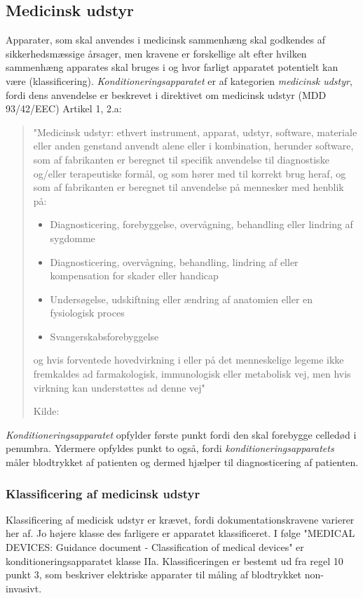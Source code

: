 \subsection{Medicinsk udstyr}
Apparater, som skal anvendes i medicinsk sammenhæng skal godkendes af sikkerhedsmæssige årsager, men kravene er forskellige alt efter hvilken sammenhæng apparates skal bruges i og hvor farligt apparatet potentielt kan være (klassificering). \textit{Konditioneringsapparatet} er af kategorien \textit{medicinsk udstyr}, fordi dens anvendelse er beskrevet i direktivet om medicinsk udstyr (MDD 93/42/EEC) Artikel 1, 2.a:

\begin{quote}
	"Medicinsk udstyr: ethvert instrument, apparat, udstyr, software,
	materiale eller anden genstand anvendt alene eller i kombination,
	herunder software, som af fabrikanten er beregnet til specifik anvendelse
	til diagnostiske og/eller terapeutiske formål, og som hører med
	til korrekt brug heraf, og som af fabrikanten er beregnet til anvendelse
	på mennesker med henblik på:
	\begin{itemize}
		\item Diagnosticering, forebyggelse, overvågning, behandling eller
		lindring af sygdomme
		\item Diagnosticering, overvågning, behandling, lindring af eller
		kompensation for skader eller handicap
		\item Undersøgelse, udskiftning eller ændring af anatomien eller en
		fysiologisk proces
		\item Svangerskabsforebyggelse
	\end{itemize}
	
	og hvis forventede hovedvirkning i eller på det menneskelige
	legeme ikke fremkaldes ad farmakologisk, immunologisk eller metabolisk
	vej, men hvis virkning kan understøttes ad denne vej"
	
	Kilde:  
\end{quote}

\textit{Konditioneringsapparatet} opfylder første punkt fordi den skal forebygge celledød i penumbra. Ydermere opfyldes punkt to også, fordi \textit{konditioneringsapparatets} måler blodtrykket af patienten og dermed hjælper til diagnosticering af patienten.

\subsubsection{Klassificering af medicinsk udstyr}
Klassificering af medicisk udstyr er krævet, fordi dokumentationskravene varierer her af. Jo højere klasse des farligere er apparatet klassificeret. I følge "MEDICAL DEVICES: Guidance document - Classification of medical devices" er konditioneringsapparatet klasse IIa. Klassificeringen er bestemt ud fra regel 10 punkt 3, som beskriver elektriske apparater til måling af blodtrykket non-invasivt.

